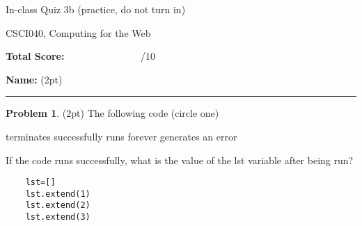 \documentclass[10pt]{article}
\theoremstyle{definition}
\newtheorem{problem}{Problem}
\begin{document}
\begin{center}
    {
\Large
In-class Quiz 3b (practice, do not turn in)
}

    \vspace{0.1in}
CSCI040, Computing for the Web

    \vspace{0.1in}
\end{center}

\vspace{0.25in}
\noindent
\textbf{Total Score:} ~~~~~~~~~~~~~~~/10

\vspace{0.5in}
\noindent
\textbf{Name:} (2pt)

\noindent
\rule{\textwidth}{0.1pt}
\vspace{0.25in}

\begin{problem}
    (2pt)
    The following code (circle one)
    
    \vspace{0.25in}
    \hspace{0.5in}terminates successfully
    \hspace{1in}runs forever
    \hspace{1in}generates an error
    \vspace{0.25in}

    \noindent
    If the code runs successfully, what is the value of the lst variable after being run?
\end{problem}
\begin{lstlisting}
    lst=[]
    lst.extend(1)
    lst.extend(2)
    lst.extend(3)
\end{lstlisting}
\vspace{1.5in}
\end{document}

